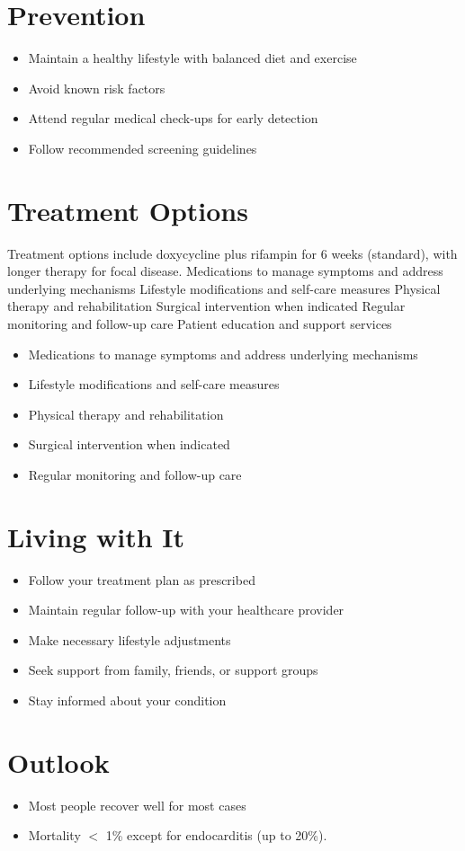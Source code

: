 \section{Prevention}
\begin{itemize}[noitemsep]
  \item Maintain a healthy lifestyle with balanced diet and exercise
  \item Avoid known risk factors
  \item Attend regular medical check-ups for early detection
  \item Follow recommended screening guidelines
\end{itemize}
\section{Treatment Options}
Treatment options include doxycycline plus rifampin for 6 weeks (standard), with longer therapy for focal disease. Medications to manage symptoms and address underlying mechanisms Lifestyle modifications and self-care measures Physical therapy and rehabilitation Surgical intervention when indicated Regular monitoring and follow-up care Patient education and support services

\begin{itemize}[noitemsep]
  \item Medications to manage symptoms and address underlying mechanisms
  \item Lifestyle modifications and self-care measures
  \item Physical therapy and rehabilitation
  \item Surgical intervention when indicated
  \item Regular monitoring and follow-up care
\end{itemize}
\section{Living with It}
\begin{itemize}[noitemsep]
  \item Follow your treatment plan as prescribed
  \item Maintain regular follow-up with your healthcare provider
  \item Make necessary lifestyle adjustments
  \item Seek support from family, friends, or support groups
  \item Stay informed about your condition
\end{itemize}
\section{Outlook}
\begin{itemize}[noitemsep]
  \item Most people recover well for most cases
  \item Mortality $<$ 1\% except for endocarditis (up to 20\%).
\end{itemize}

